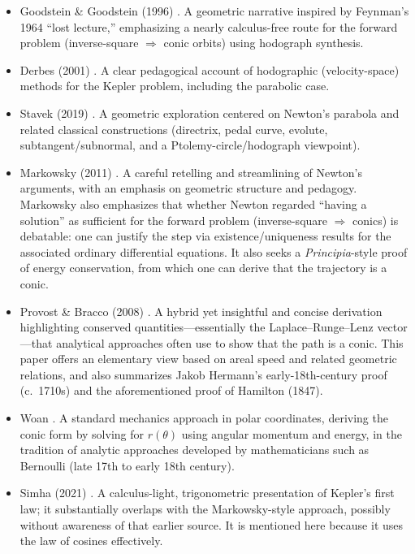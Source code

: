 \begin{itemize}
  \item Goodstein \& Goodstein (1996) \cite{goodstein1996feynman}. A geometric narrative inspired by Feynman's 1964 ``lost lecture,'' emphasizing a nearly calculus-free route for the forward problem (inverse-square $\Rightarrow$ conic orbits) using hodograph synthesis.

  \item Derbes (2001) \cite{derbes2001reinventing}. A clear pedagogical account of hodographic (velocity-space) methods for the Kepler problem, including the parabolic case.

  \item Stavek (2019) \cite{stavek2019newtonsparabola}. A geometric exploration centered on Newton's parabola and related classical constructions (directrix, pedal curve, evolute, subtangent/subnormal, and a Ptolemy-circle/hodograph viewpoint).

  \item Markowsky (2011) \cite{markowsky2011newton}. A careful retelling and streamlining of Newton's arguments, with an emphasis on geometric structure and pedagogy. Markowsky also emphasizes that whether Newton regarded ``having a solution'' as sufficient for the forward problem (inverse-square $\Rightarrow$ conics) is debatable: one can justify the step via existence/uniqueness results for the associated ordinary differential equations. It also seeks a \emph{Principia}-style proof of energy conservation, from which one can derive that the trajectory is a conic.

  \item Provost \& Bracco (2008) \cite{provostbracco2008simple}. A hybrid yet insightful and concise derivation highlighting conserved quantities---essentially the Laplace--Runge--Lenz vector---that analytical approaches often use to show that the path is a conic. This paper offers an elementary view based on areal speed and related geometric relations, and also summarizes Jakob Hermann's early-18th-century proof (c.\ 1710s) and the aforementioned proof of Hamilton (1847).

  \item Woan \cite{a1dynamicalastronomy}. A standard mechanics approach in polar coordinates, deriving the conic form by solving for $r(\theta)$ using angular momentum and energy, in the tradition of analytic approaches developed by mathematicians such as Bernoulli (late 17th to early 18th century).

  \item Simha (2021) \cite{simha2021algebra}. A calculus-light, trigonometric presentation of Kepler's first law; it substantially overlaps with the Markowsky-style approach, possibly without awareness of that earlier source. It is mentioned here because it uses the law of cosines effectively.


\end{itemize}
